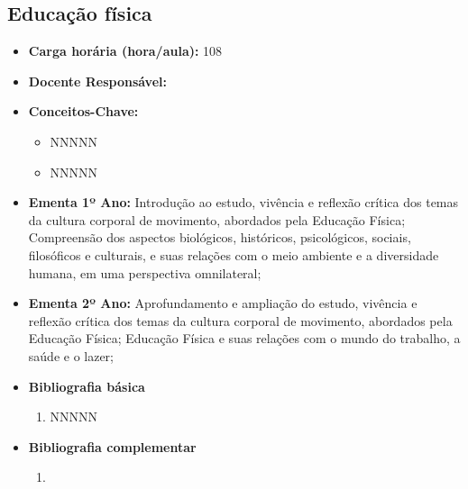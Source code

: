 \documentclass[11pt,fleqn]{book} %
\begin{document}
\subsection{Educação física}\label{disc:educacaofisica}
\begin{itemize}
	\item \textbf{Carga horária (hora/aula):} 108
	\item \textbf{Docente Responsável:}
	\item \textbf{Conceitos-Chave:}
	\begin{itemize}
		\item NNNNN
		\item NNNNN
	\end{itemize}
	\item \textbf{Ementa 1º Ano:} 
	Introdução ao estudo, vivência e reflexão crítica dos temas da cultura corporal de movimento, abordados pela Educação Física;
	Compreensão dos aspectos biológicos, históricos, psicológicos, sociais, filosóficos e culturais, e suas relações com o meio ambiente e a diversidade humana, em uma perspectiva omnilateral;

	\item \textbf{Ementa 2º Ano:} 
	Aprofundamento e ampliação do estudo, vivência e reflexão crítica dos temas da cultura corporal de movimento, abordados pela Educação Física;
	Educação Física e suas relações com o mundo do trabalho, a saúde e o lazer;	
	\item \textbf{Bibliografia básica}
	\begin{enumerate}
		\item NNNNN
	\end{enumerate}
	\item \textbf{Bibliografia complementar}
	\begin{enumerate}
		\item 
	\end{enumerate}	
\end{itemize}


\newpage
\end{document}
